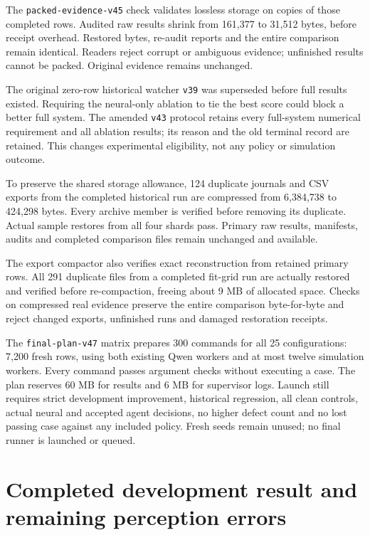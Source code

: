 \documentclass[10pt,letterpaper]{article}
\begin{document}
The \texttt{packed-evidence-v45} check validates lossless storage on copies of
those completed rows. Audited raw results shrink from 161,377 to 31,512 bytes,
before receipt overhead. Restored bytes, re-audit reports and the entire
comparison remain identical. Readers reject corrupt or ambiguous evidence;
unfinished results cannot be packed. Original evidence remains unchanged.

The original zero-row historical watcher \texttt{v39} was superseded before
full results existed. Requiring the neural-only ablation to tie the best score
could block a better full system. The amended \texttt{v43} protocol retains
every full-system numerical requirement and all ablation results; its reason
and the old terminal record are retained. This changes experimental eligibility,
not any policy or simulation outcome.

To preserve the shared storage allowance, 124 duplicate journals and CSV exports
from the completed historical run are compressed from 6,384,738 to 424,298 bytes.
Every archive member is verified before removing its duplicate. Actual sample
restores from all four shards pass. Primary raw results, manifests, audits and
completed comparison files remain unchanged and available.

The export compactor also verifies exact reconstruction from retained primary
rows. All 291 duplicate files from a completed fit-grid run are actually restored
and verified before re-compaction, freeing about 9 MB of allocated space. Checks
on compressed real evidence preserve the entire comparison byte-for-byte and
reject changed exports, unfinished runs and damaged restoration receipts.

The \texttt{final-plan-v47} matrix prepares 300 commands for all 25 configurations:
7,200 fresh rows, using both existing Qwen workers and at most twelve simulation
workers. Every command passes argument checks without executing a case. The
plan reserves 60 MB for results and 6 MB for supervisor logs. Launch still requires
strict development improvement, historical regression, all clean controls,
actual neural and accepted agent decisions, no higher defect count and no lost
passing case against any included policy. Fresh seeds remain unused; no final
runner is launched or queued.

\clearpage
\section{Completed development result and remaining perception errors}
\end{document}

